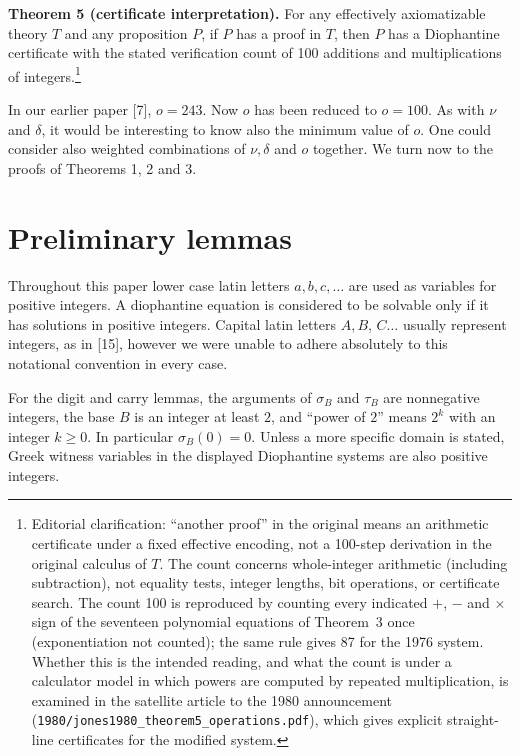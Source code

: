\documentclass[11pt,a4paper]{article}
\begin{document}
\noindent\textbf{Theorem 5 (certificate interpretation).} For any effectively axiomatizable theory $T$ and any proposition $P$, if $P$ has a proof in $T$, then $P$ has a Diophantine certificate with the stated verification count of 100 additions and multiplications of integers.\footnote{Editorial clarification: ``another proof'' in the original means an arithmetic certificate under a fixed effective encoding, not a 100-step derivation in the original calculus of $T$. The count concerns whole-integer arithmetic (including subtraction), not equality tests, integer lengths, bit operations, or certificate search. The count 100 is reproduced by counting every indicated $+$, $-$ and $\times$ sign of the seventeen polynomial equations of Theorem~3 once (exponentiation not counted); the same rule gives 87 for the 1976 system. Whether this is the intended reading, and what the count is under a calculator model in which powers are computed by repeated multiplication, is examined in the satellite article to the 1980 announcement (\texttt{1980/jones1980\_theorem5\_operations.pdf}), which gives explicit straight-line certificates for the modified system.}

In our earlier paper [7], $o=243$. Now $o$ has been reduced to $o=100$. As with $\nu$ and $\delta$, it would be interesting to know also the minimum value of $o$. One could consider also weighted combinations of $\nu,\allowbreak  \delta$ and $o$ together. We turn now to the proofs of Theorems 1, 2 and 3.

\section{Preliminary lemmas} Throughout this paper lower case latin letters $a,\allowbreak  b,\allowbreak  c,\allowbreak  \ldots$ are used as variables for positive integers. A diophantine equation is considered to be solvable only if it has solutions in positive integers. Capital latin letters $A,\allowbreak  B$, $C \ldots$ usually represent integers, as in [15], however we were unable to adhere absolutely to this notational convention in every case.

For the digit and carry lemmas, the arguments of $\sigma_B$ and $\tau_B$ are nonnegative integers, the base $B$ is an integer at least $2$, and ``power of $2$'' means $2^k$ with an integer $k\geq0$. In particular $\sigma_B(0)=0$. Unless a more specific domain is stated, Greek witness variables in the displayed Diophantine systems are also positive integers.
\end{document}
